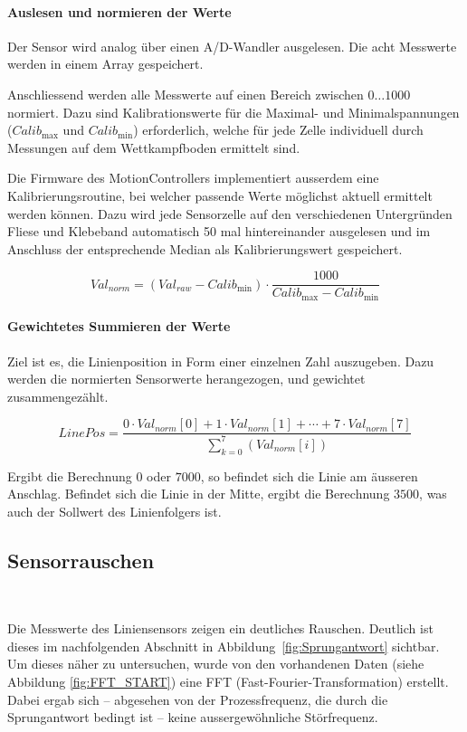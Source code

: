 \documentclass[main.tex]{subfiles} %
\begin{document}
\paragraph{Auslesen und normieren der Werte}

Der Sensor wird analog über einen A/D-Wandler ausgelesen. Die acht Messwerte
werden in einem Array gespeichert.

Anschliessend werden alle Messwerte auf einen Bereich zwischen $0 \dots 1000$
normiert. Dazu sind Kalibrationswerte für die Maximal- und Minimalspannungen
($Calib_{\max}$ und $Calib_{\min}$) erforderlich, welche für jede Zelle
individuell durch Messungen auf dem Wettkampfboden ermittelt sind.

Die Firmware des MotionControllers implementiert ausserdem eine
Kalibrierungsroutine, bei welcher passende Werte möglichst aktuell ermittelt
werden können. Dazu wird jede Sensorzelle auf den verschiedenen Untergründen
Fliese und Klebeband automatisch 50 mal hintereinander ausgelesen und im
Anschluss der entsprechende Median als Kalibrierungswert gespeichert.

\[
    Val_{norm} = (Val_{raw} - Calib_{\min}) \cdot \frac{1000}{Calib_{\max} - Calib_{\min}}
\]

\paragraph{Gewichtetes Summieren der Werte}
Ziel ist es, die Linienposition in Form einer einzelnen Zahl auszugeben. Dazu
werden die normierten Sensorwerte herangezogen, und gewichtet zusammengezählt.

\[
    LinePos = \frac{0 \cdot Val_{norm}[0] + 1 \cdot Val_{norm}[1] + \cdots + 7 \cdot Val_{norm}[7]}{\sum_{k=0}^{7}(Val_{norm}[i])}
\]

Ergibt die Berechnung $0$ oder $7000$, so befindet sich die Linie am äusseren
Anschlag. Befindet sich die Linie in der Mitte, ergibt die Berechnung $3500$,
was auch der Sollwert des Linienfolgers ist.

\subsection*{Sensorrauschen}~\label{apdx:Liniensensor_rauschen}

Die Messwerte des Liniensensors zeigen ein deutliches Rauschen. Deutlich ist
dieses im nachfolgenden Abschnitt in Abbildung~\ref{fig:Sprungantwort}
sichtbar. Um dieses näher zu untersuchen, wurde von den vorhandenen Daten
(siehe Abbildung \ref{fig:FFT_START}) eine FFT (Fast-Fourier-Transformation)
erstellt. Dabei ergab sich – abgesehen von der Prozessfrequenz, die durch die
Sprungantwort bedingt ist – keine aussergewöhnliche Störfrequenz.
\end{document}
